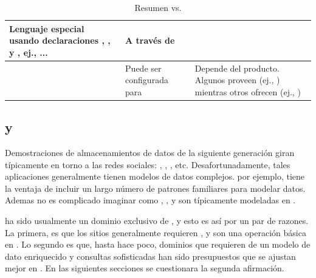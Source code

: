 \begin{table}[h!]
\begin{tabular}{ |L{0.1\paperwidth}|L{0.3\paperwidth}|L{0.3\paperwidth}|}
	Lenguaje especial usando declaraciones \selectDB, \insertDB, y \updateDB, ej., \selectDBUpper \fields \fromDBUpper \tableDB \whereDBUpper ... &	
	
	A través de \apis \objectOriented

\\ \hline

	\consistencyDB&
	
	Puede ser configurada para \strongConsistency&
	
	Depende del producto. Algunos proveen \strongConsistency (ej., \mongodbNAME) mientras otros ofrecen \eventualConsistency (ej., \cassandraNAME)

\\ \hline
\end{tabular}
    \caption{ Resumen \nosql vs. \sql}
    \label{tab:SQL_vs_noSQL_summary}
\end{table}

\subsection{\mongodbNAME y \ecommerce \cite{online_mongodb_ecommerce}}
\label{cap:justificacion_proyecto:MongoDB_ECommerce}

Demostraciones de almacenamientos de datos de la siguiente generación giran típicamente en torno a las redes sociales: \twitter, \facebook, \foursquare, etc. Desafortunadamente, tales aplicaciones generalmente tienen modelos de datos complejos. \ecommerce por ejemplo, tiene la ventaja de incluir un largo número de patrones familiares para modelar datos. Ademas no es complicado imaginar como \itemCOM, \categoriesCommerce, \itemReviewsCommerce y \ordersCommerce son típicamente modeladas en \rdbms.

\ecommerce ha sido usualmente un dominio exclusivo de \rdbms, y esto es así por un par de razones. La primera, es que los sitios \ecommerce generalmente requieren \transactionsDB, y \transactionsDB son una operación básica en \rdbms. Lo segundo es que, hasta hace poco, dominios que requieren de un modelo de dato enriquecido y consultas sofisticadas han sido presupuestos que se ajustan mejor en \rdbms. En las siguientes secciones se cuestionara la segunda afirmación. 

